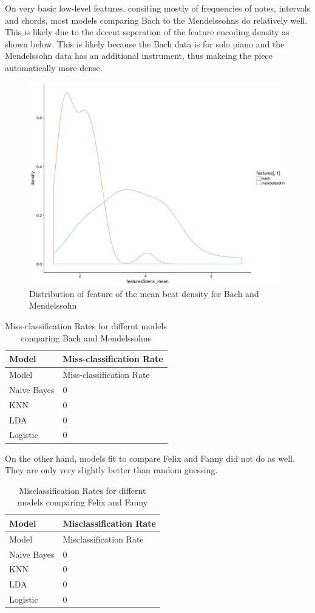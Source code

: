 \documentclass[12pt,twoside]{reedthesis}
\theoremstyle{definition}
\theoremstyle{definition}
\theoremstyle{definition}
\theoremstyle{remark}
\begin{document}
On very basic low-level features, consiting mostly of frequencies of
notes, intervals and chords, most models comparing Bach to the
Mendelssohns do relatively well. This is likely due to the decent
seperation of the feature encoding density as shown below. This is
likely because the Bach data is for solo piano and the Mendelssohn data
has an additional instrument, thus makeing the piece automatically more
dense.
\begin{figure}[h]
\centering
\includegraphics[scale = .5]{images/dens.png}
\caption{Distribution of feature of the mean beat density for Bach and Mendelssohn}
\label{subd}
\end{figure}
\begin{longtable}[]{@{}ll@{}}
\caption{Miss-classification Rates for differnt models comparing Bach
and Mendelssohns}\tabularnewline
\toprule
Model & Miss-classification Rate\tabularnewline
\midrule
\endfirsthead
\toprule
Model & Miss-classification Rate\tabularnewline
\midrule
\endhead
Naive Bayes & 0\tabularnewline
KNN & 0\tabularnewline
LDA & 0\tabularnewline
Logistic & 0\tabularnewline
\bottomrule
\end{longtable}
On the other hand, models fit to compare Felix and Fanny did not do as
well. They are only very slightly better than random guessing.
\begin{longtable}[]{@{}ll@{}}
\caption{Misclassification Rates for differnt models comparing Felix and
Fanny}\tabularnewline
\toprule
Model & Misclassification Rate\tabularnewline
\midrule
\endfirsthead
\toprule
Model & Misclassification Rate\tabularnewline
\midrule
\endhead
Naive Bayes & 0\tabularnewline
KNN & 0\tabularnewline
LDA & 0\tabularnewline
Logistic & 0\tabularnewline
\bottomrule
\end{longtable}
\end{document}

